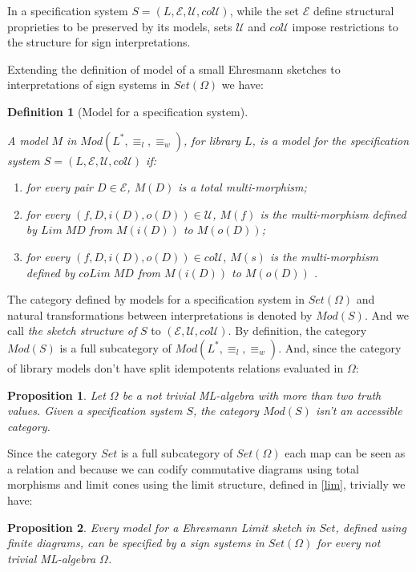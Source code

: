 \documentclass[oribibl]{llncs}
\newtheorem{prop}{Proposition}
\newtheorem{defn}{Definition}
\newcommand{\E}{\mathcal{E}}
\newcommand{\U}{\mathcal{U}}
\begin{document}
In a specification system  $S=(L,\E,\U,co\U)$, while the set $\E$ define structural proprieties to be preserved by its models, sets $\U$ and $co\U$ impose restrictions to the structure for sign interpretations.

Extending the definition of model of a small Ehresmann sketches to interpretations of sign systems in $Set(\Omega)$ we have:
\begin{defn}[Model for a specification system]\label{Modelspec}

 A model $M$ in $Mod(L^\ast,\equiv_l,\equiv_w)$, for library $L$, is a model for the specification system
$S=(L,\E,\U,co\U)$ if:
\begin{enumerate}
  \item for every pair $D\in \E$,  $M(D)$ is a total multi-morphism;
  \item for every $(f,D,i(D),o(D))\in \U$, $M(f)$ is the multi-morphism defined by $Lim\;MD$ from $M(i(D))$ to $M(o(D))$;
  \item for every $(f,D,i(D),o(D))\in co\U$, $M(s)$ is the multi-morphism defined by $coLim\;MD$ from $M(i(D))$ to $M(o(D))$ .
\end{enumerate}

\end{defn}
The category defined by models for a specification system in
$Set(\Omega)$ and natural transformations between interpretations is denoted by $Mod(S)$. And we call \emph{the sketch structure of} $S$ to $(\E,\U,co\U)$. By definition, the category $Mod(S)$ is a full subcategory of $Mod(L^\ast,\equiv_l,\equiv_w)$. And, since the category of library models don't have split idempotents relations evaluated in $\Omega$:

\begin{prop}
Let $\Omega$ be a not trivial ML-algebra with more than two truth values. Given a specification system $S$, the category $Mod(S)$ isn't an accessible category.
\end{prop}

Since the category $Set$ is a full subcategory of $Set(\Omega)$ each map can be seen as a relation and because we can codify commutative diagrams using total morphisms and limit cones using the limit structure, defined in \ref{lim}, trivially we have:
\begin{prop}
Every model for a Ehresmann Limit sketch in  $Set$,
defined using finite diagrams, can be specified by a sign systems in
$Set(\Omega)$ for every not trivial ML-algebra $\Omega$.
\end{prop}
\end{document}
